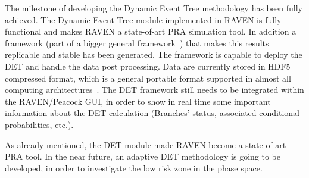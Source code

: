 \label{sec:conclusions}
The milestone of developing the Dynamic Event Tree methodology has been fully achieved. The Dynamic Event Tree module implemented in RAVEN is fully functional and makes RAVEN a state-of-art PRA simulation tool. In addition a framework (part of a bigger general framework~\cite{RAVENFY13}) that makes this results replicable and stable has been generated. The framework is capable to deploy the DET and handle the data post processing. Data are currently stored in HDF5 compressed format, which is a general portable format supported in almost all computing architectures~\cite{HDF5}. 
The DET framework still needs to be integrated within the RAVEN/Peacock GUI, in order to show in real time some important information about the DET calculation (Branches' status, associated conditional probabilities, etc.).

As already mentioned, the DET module made RAVEN become a state-of-art PRA tool. In the near future, an adaptive DET methodology is going to be developed, in order to investigate the low risk zone in the phase space.
  
